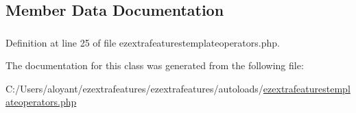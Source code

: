 \subsection{Member Data Documentation}
\hypertarget{classextension_1_1ezextrafeatures_1_1autoloads_1_1e_z_extra_features_template_operators_ad81ef6b7a3d4066c21ba7ff179dc8757}{
\subsubsection[{\$\-Operators}]{}}\label{classextension_1_1ezextrafeatures_1_1autoloads_1_1e_z_extra_features_template_operators_ad81ef6b7a3d4066c21ba7ff179dc8757}


Definition at line 25 of file ezextrafeaturestemplateoperators.\-php.



The documentation for this class was generated from the following file\-:\begin{DoxyCompactItemize}
\item 
C\-:/\-Users/aloyant/ezextrafeatures/ezextrafeatures/autoloads/\hyperlink{ezextrafeaturestemplateoperators_8php}{ezextrafeaturestemplateoperators.\-php}\end{DoxyCompactItemize}
